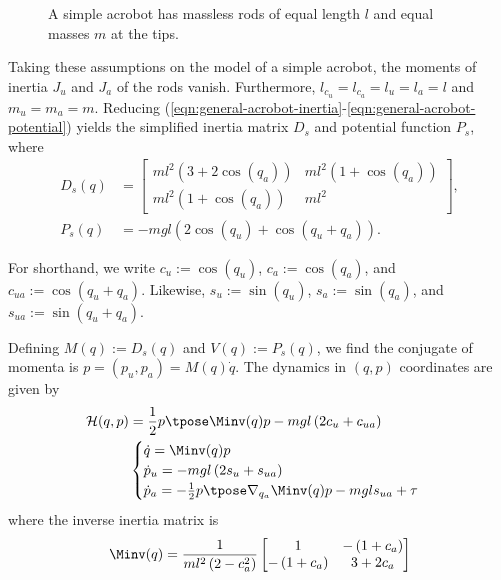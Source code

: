 \begin{figure}
    \centering
    
    \caption{A simple acrobot has massless rods of equal length \(l\) and 
    equal masses \(m\) at the tips.}
    \label{fig:simple-acrobot-model}
\end{figure}

Taking these assumptions on the model of a simple acrobot, 
the moments of inertia \(J_u\) and \(J_a\) of the rods vanish. 
Furthermore, \(l_{c_u} = l_{c_a} = l_u = l_a = l\) and
\(m_u = m_a = m\). 
Reducing
(\ref{eqn:general-acrobot-inertia}-\ref{eqn:general-acrobot-potential})
yields the simplified inertia matrix \(D_s\) and potential function \(P_s\),
where
\begin{align}
    D_s(q) &= \begin{bmatrix}
        ml^2\left(3+2\cos(q_a)\right) & 
        ml^2\left(1+\cos(q_a)\right) \\
        ml^2\left(1+\cos(q_a)\right) &
        ml^2
    \end{bmatrix} 
    , \\
    P_s(q) &= -mgl\left(2\cos(q_u)+\cos(q_u+q_a)\right)
    .
\end{align}
\begin{notation}
    For shorthand, we write \(c_u := \cos(q_u)\), \(c_a := \cos(q_a)\), and 
    \(c_{ua} := \cos(q_u + q_a)\). Likewise, \(s_u := \sin(q_u)\), 
    \(s_a := \sin(q_a)\), and \(s_{ua} := \sin(q_u + q_a)\).
\end{notation}

Defining \(M(q) := D_s(q)\) and \(V(q) := P_s(q)\), we find the conjugate of momenta 
is \(p = (p_u, p_a) = M(q)\dot{q}\).
The dynamics in \((q,p)\) coordinates are given by
\begin{align}\label{eqn:acrobot-hamiltonian}
    \mathcal{H}(q,p) &= \frac{1}{2}p\tpose \Minv(q) p -
    mgl\left(2 c_u + c_{ua}\right)\\
     &\begin{cases}
        \dot{q} = \Minv(q) p \\
        \dot{p}_u = -mgl\left(2s_u + s_{ua}\right) \\
        \dot{p}_a =-\frac{1}{2}p\tpose \nabla_{q_a}\Minv(q) p
        - mgl s_{ua} + \tau
    \end{cases} \nonumber
\end{align}
where the inverse inertia matrix is
\begin{equation}\label{eqn:Minv}
    \Minv(q) = \frac{1}{ml^2\left(2-c_a^2\right)}
    \begin{bmatrix}
        1 &
        -\left(1+c_a\right) \\
        -\left(1+c_a\right) &
        3+2c_a
    \end{bmatrix}
\end{equation}

